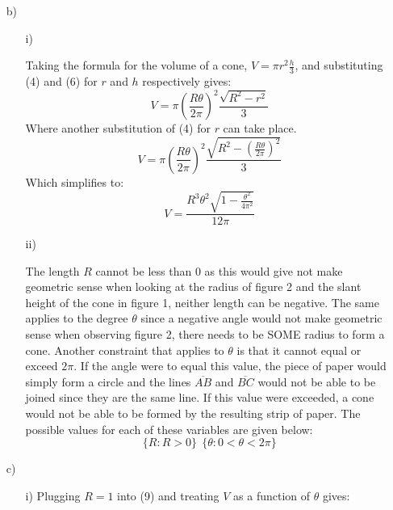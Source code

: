 \documentclass{article}
\begin{document}
\begin{itemize}
\begin{itemize}
    \end{itemize}
    \item[b)]
    \begin{itemize}
        \item[i)]
        
        Taking the formula for the volume of a cone, \(V=\pi r^2\frac{h}{3}\), and substituting (4) and (6) for \(r\) and \(h\) respectively gives:
        \begin{equation}
            V=\pi \left(\frac{R\theta}{2\pi}\right)^2\frac{\sqrt{R^2-r^2}}{3}
        \end{equation}
        Where another substitution of (4) for \(r\) can take place. 
        \begin{equation}
            V=\pi \left(\frac{R\theta}{2\pi}\right)^2\frac{\sqrt{R^2-\left(\frac{R\theta}{2\pi}\right)^2}}{3}
        \end{equation}
        Which simplifies to:
        \begin{equation}
            V=\frac{R^3\theta^2\sqrt{1-\frac{\theta^2}{4\pi^2}}}{12\pi}
        \end{equation}
        
        \item[ii)]
        
        The length \(R\) cannot be less than 0 as this would give not make geometric sense when looking at the radius of figure 2 and the slant height of the cone in figure 1, neither length can be negative. The same applies to the degree \(\theta\) since a negative angle would not make geometric sense when observing figure 2, there needs to be SOME radius to form a  cone. Another constraint that applies to \(\theta\) is that it cannot equal or exceed \(2\pi\). If the angle were to equal this value, the piece of paper would simply form a circle and the lines \(\overline{AB}\) and \(\overline{BC}\) would not be able to be joined since they are the same line. If this value were exceeded, a cone would not be able to be formed by the resulting strip of paper. The possible values for each of these variables are given below:
        \[\{R:R>0\}\ \ \{\theta:0<\theta<2\pi\}\]
        
    \end{itemize}
    \item[c)]
    \begin{itemize}
        \item[i)]
        Plugging \(R=1\) into (9) and treating \(V\) as a function of \(\theta\) gives: 
        \begin{equation}


\end{equation}
\end{itemize}
\end{itemize}
\end{document}
